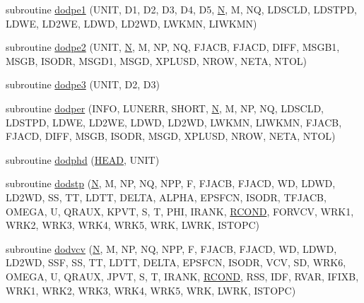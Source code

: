 \begin{DoxyCompactItemize}
\item 
subroutine \hyperlink{d__odr_8f_a6e54bf21d9c45ea7421dae931fb2cc64}{dodpe1} (U\+N\+I\+T, D1, D2, D3, D4, D5, \hyperlink{polmisc_8c_a0240ac851181b84ac374872dc5434ee4}{N}, M, N\+Q, L\+D\+S\+C\+L\+D, L\+D\+S\+T\+P\+D, L\+D\+W\+E, L\+D2\+W\+E, L\+D\+W\+D, L\+D2\+W\+D, L\+W\+K\+M\+N, L\+I\+W\+K\+M\+N)
\item 
subroutine \hyperlink{d__odr_8f_a6b7a160aff87afec462d3baec94ab90a}{dodpe2} (U\+N\+I\+T, \hyperlink{polmisc_8c_a0240ac851181b84ac374872dc5434ee4}{N}, M, N\+P, N\+Q, F\+J\+A\+C\+B, F\+J\+A\+C\+D, D\+I\+F\+F, M\+S\+G\+B1, M\+S\+G\+B, I\+S\+O\+D\+R, M\+S\+G\+D1, M\+S\+G\+D, X\+P\+L\+U\+S\+D, N\+R\+O\+W, N\+E\+T\+A, N\+T\+O\+L)
\item 
subroutine \hyperlink{d__odr_8f_a1ddc8d5729651058752eea4a559bbba3}{dodpe3} (U\+N\+I\+T, D2, D3)
\item 
subroutine \hyperlink{d__odr_8f_a735cc1aac7c62c231d2ba4bf9d618bf1}{dodper} (I\+N\+F\+O, L\+U\+N\+E\+R\+R, S\+H\+O\+R\+T, \hyperlink{polmisc_8c_a0240ac851181b84ac374872dc5434ee4}{N}, M, N\+P, N\+Q, L\+D\+S\+C\+L\+D, L\+D\+S\+T\+P\+D, L\+D\+W\+E, L\+D2\+W\+E, L\+D\+W\+D, L\+D2\+W\+D, L\+W\+K\+M\+N, L\+I\+W\+K\+M\+N, F\+J\+A\+C\+B, F\+J\+A\+C\+D, D\+I\+F\+F, M\+S\+G\+B, I\+S\+O\+D\+R, M\+S\+G\+D, X\+P\+L\+U\+S\+D, N\+R\+O\+W, N\+E\+T\+A, N\+T\+O\+L)
\item 
subroutine \hyperlink{d__odr_8f_a360353f1c24d227da36a66831da54042}{dodphd} (\hyperlink{superlu__enum__consts_8h_a9c99a6c403d30f227aa91cf3b10f6aa4a0b0955668575b21eb0ab2272aef49f76}{H\+E\+A\+D}, U\+N\+I\+T)
\item 
subroutine \hyperlink{d__odr_8f_a4eda519f7f66704f49038b0667144742}{dodstp} (\hyperlink{polmisc_8c_a0240ac851181b84ac374872dc5434ee4}{N}, M, N\+P, N\+Q, N\+P\+P, F, F\+J\+A\+C\+B, F\+J\+A\+C\+D, W\+D, L\+D\+W\+D, L\+D2\+W\+D, S\+S, T\+T, L\+D\+T\+T, D\+E\+L\+T\+A, A\+L\+P\+H\+A, E\+P\+S\+F\+C\+N, I\+S\+O\+D\+R, T\+F\+J\+A\+C\+B, O\+M\+E\+G\+A, U, Q\+R\+A\+U\+X, K\+P\+V\+T, S, T, P\+H\+I, I\+R\+A\+N\+K, \hyperlink{superlu__enum__consts_8h_af00a42ecad444bbda75cde1b64bd7e72a9b5c151728d8512307565994c89919d5}{R\+C\+O\+N\+D}, F\+O\+R\+V\+C\+V, W\+R\+K1, W\+R\+K2, W\+R\+K3, W\+R\+K4, W\+R\+K5, W\+R\+K, L\+W\+R\+K, I\+S\+T\+O\+P\+C)
\item 
subroutine \hyperlink{d__odr_8f_a531cb6b03c2e8ef98fd9094ccd397859}{dodvcv} (\hyperlink{polmisc_8c_a0240ac851181b84ac374872dc5434ee4}{N}, M, N\+P, N\+Q, N\+P\+P, F, F\+J\+A\+C\+B, F\+J\+A\+C\+D, W\+D, L\+D\+W\+D, L\+D2\+W\+D, S\+S\+F, S\+S, T\+T, L\+D\+T\+T, D\+E\+L\+T\+A, E\+P\+S\+F\+C\+N, I\+S\+O\+D\+R, V\+C\+V, S\+D, W\+R\+K6, O\+M\+E\+G\+A, U, Q\+R\+A\+U\+X, J\+P\+V\+T, S, T, I\+R\+A\+N\+K, \hyperlink{superlu__enum__consts_8h_af00a42ecad444bbda75cde1b64bd7e72a9b5c151728d8512307565994c89919d5}{R\+C\+O\+N\+D}, R\+S\+S, I\+D\+F, R\+V\+A\+R, I\+F\+I\+X\+B, W\+R\+K1, W\+R\+K2, W\+R\+K3, W\+R\+K4, W\+R\+K5, W\+R\+K, L\+W\+R\+K, I\+S\+T\+O\+P\+C)

\end{DoxyCompactItemize}

